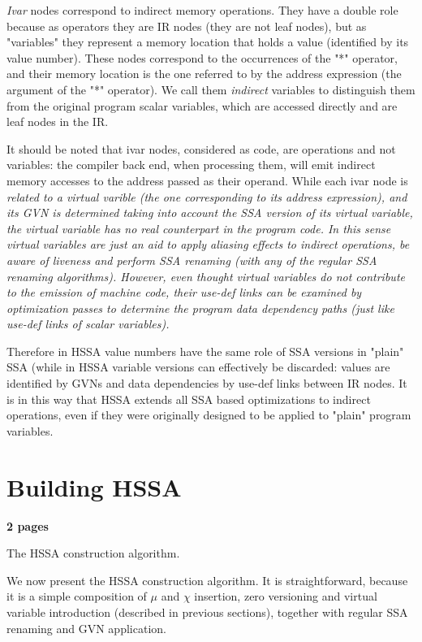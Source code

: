 {\em Ivar} nodes correspond to indirect memory operations.
They have a double role because as operators they are IR nodes (they are not leaf nodes), but as "variables" they represent a memory location that holds a value (identified by its value number).
These nodes correspond to the occurrences of the "*" operator, and their memory location is the one referred to by the address expression (the argument of the "*" operator).
We call them {\em indirect} variables to distinguish them from the original program scalar variables, which are accessed directly and are leaf nodes in the IR.

It should be noted that ivar nodes, considered as code, are operations and not variables: the compiler back end, when processing them, will emit indirect memory accesses to the address passed as their operand.
While each ivar node is \em{related} to a virtual varible (the one corresponding to its address expression), and its GVN is determined taking into account the SSA version of its virtual variable, the virtual variable has no real counterpart in the program code.
In this sense virtual variables are just an aid to apply aliasing effects to indirect operations, be aware of liveness and perform SSA renaming (with any of the regular SSA renaming algorithms).
However, even thought virtual variables do not contribute to the emission of machine code, their use-def links can be examined by optimization passes to determine the program data dependency paths (just like use-def links of scalar variables).

Therefore in HSSA value numbers have the same role of SSA versions in "plain" SSA (while in HSSA variable versions can effectively be discarded: values are identified by GVNs and data dependencies by use-def links between IR nodes.
It is in this way that HSSA extends all SSA based optimizations to indirect operations, even if they were originally designed to be applied to "plain" program variables.


\section{Building HSSA}
\textbf{2 pages}

The HSSA construction algorithm.

We now present the HSSA construction algorithm.
It is straightforward, because it is a simple composition of $\mu$ and $\chi$ insertion, zero versioning and virtual variable introduction (described in previous sections), together with regular SSA renaming and GVN application.


